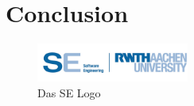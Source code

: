 \chapter{Conclusion}

\begin{figure}[ht!]
\begin{center}\includegraphics[width=5cm]{src/pic/logo}\end{center}
\caption{Das SE Logo}
\label{Logo}
\end{figure}

\cleardoublepage
